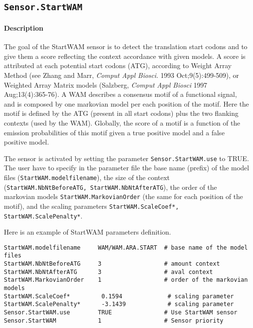 
\subsection{\texttt{Sensor.StartWAM}}

\paragraph{Description}

The goal of the StartWAM sensor is to detect the translation start
codons and to give them a score reflecting the context accordance with
given models. A score is attributed at each potential start codons
(ATG), according to Weight Array Method (see Zhang and Marr, {\em
  Comput Appl Biosci.} 1993 Oct;9(5):499-509), or Weighted Array
Matrix models (Salzberg, {\em Comput Appl Biosci} 1997
Aug;13(4):365-76). A WAM describes a consensus motif of a functional
signal, and is composed by one markovian model per each position of
the motif. Here the motif is defined by the ATG (present in all start
codons) plus the two flanking contexts (used by the WAM).  Globally,
the score of a motif is a function of the emission probabilities of
this motif given a true positive model and a false positive model.

The sensor is activated by setting the parameter
\texttt{Sensor.StartWAM.use} to TRUE.  The user have to specify in
the parameter file the base name (prefix) of the model files
(\texttt{StartWAM.modelfilename}), the size of the context
(\texttt{StartWAM.NbNtBeforeATG, StartWAM.NbNtAfterATG}), the order of
the markovian models \texttt{StartWAM.MarkovianOrder} (the same for
each position of the motif), and the scaling parameters
\texttt{StartWAM.ScaleCoef*, StartWAM.ScalePenalty*}.

Here is an example of StartWAM parameters definition.
\begin{Verbatim}[fontsize=\small]
StartWAM.modelfilename     WAM/WAM.ARA.START  # base name of the model files
StartWAM.NbNtBeforeATG     3                  # amount context
StartWAM.NbNtAfterATG      3                  # aval context
StartWAM.MarkovianOrder    1                  # order of the markovian models
StartWAM.ScaleCoef*         0.1594             # scaling parameter
StartWAM.ScalePenalty*      -3.1439            # scaling parameter
Sensor.StartWAM.use        TRUE               # Use StartWAM sensor
Sensor.StartWAM            1                  # Sensor priority
\end{Verbatim}


